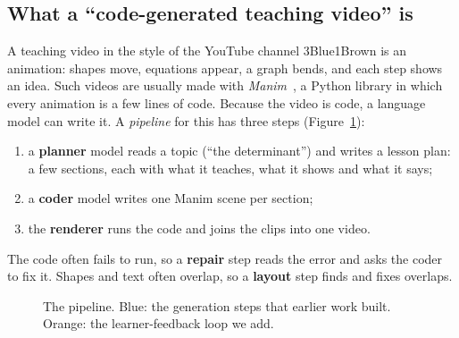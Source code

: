 \documentclass[11pt]{article}
\begin{document}
\subsection{What a ``code-generated teaching video'' is}

A teaching video in the style of the YouTube channel 3Blue1Brown is an animation: shapes move, equations appear,
a graph bends, and each step shows an idea. Such videos are usually made with \emph{Manim}~\cite{manim}, a Python
library in which every animation is a few lines of code. Because the video is code, a language model can write it.
A \emph{pipeline} for this has three steps (Figure~\ref{fig:pipeline}):
\begin{enumerate}
  \item a \textbf{planner} model reads a topic (``the determinant'') and writes a lesson plan: a few sections, each
  with what it teaches, what it shows and what it says;
  \item a \textbf{coder} model writes one Manim scene per section;
  \item the \textbf{renderer} runs the code and joins the clips into one video.
\end{enumerate}
The code often fails to run, so a \textbf{repair} step reads the error and asks the coder to fix it. Shapes and text
often overlap, so a \textbf{layout} step finds and fixes overlaps.

\begin{figure}[h]
\centering
{}
\caption{The pipeline. Blue: the generation steps that earlier work built. Orange: the learner-feedback loop we
add.}\label{fig:pipeline}
\end{figure}
\end{document}
